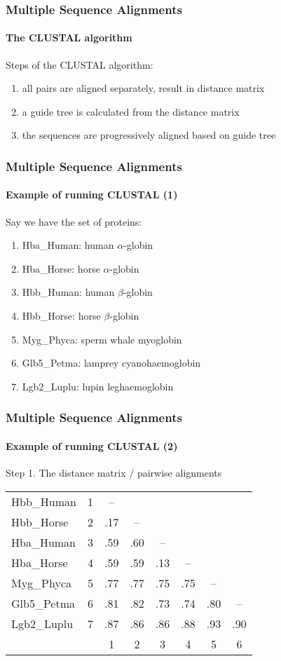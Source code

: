 \documentclass{beamer}
\begin{document}
\begin{frame}
  \frametitle{Multiple Sequence Alignments}
  \framesubtitle{The CLUSTAL algorithm}

  Steps of the CLUSTAL algorithm:
  \begin{enumerate}
    \item all pairs are aligned separately, result in distance matrix
    \item a guide tree is calculated from the distance matrix
    \item the sequences are progressively aligned based on guide tree
  \end{enumerate}
\end{frame}

\begin{frame}
  \frametitle{Multiple Sequence Alignments}
  \framesubtitle{Example of running CLUSTAL (1)}

  Say we have the set of proteins:
  \begin{enumerate}
    \item Hba\_Human: human $\alpha$-globin
    \item Hba\_Horse: horse $\alpha$-globin
    \item Hbb\_Human: human $\beta$-globin
    \item Hbb\_Horse: horse $\beta$-globin
    \item Myg\_Phyca: sperm whale myoglobin
    \item Glb5\_Petma: lamprey cyanohaemoglobin
    \item Lgb2\_Luplu: lupin leghaemoglobin
  \end{enumerate}
\end{frame}

\begin{frame}
  \frametitle{Multiple Sequence Alignments}
  \framesubtitle{Example of running CLUSTAL (2)}

  \alert{Step 1. The distance matrix / pairwise alignments}

  \begin{center}
    \begin{tabular}{lr|cccccc|}
      \cline{3-8}
      Hbb\_Human & 1 & -- &&&&& \\
      Hbb\_Horse & 2 & .17 & -- &&&& \\
      Hba\_Human & 3 & .59 & .60 & -- &&& \\
      Hba\_Horse & 4 & .59 & .59 & .13 & -- && \\
      Myg\_Phyca & 5 & .77 & .77 & .75 & .75 & -- & \\
      Glb5\_Petma & 6 & .81 & .82 & .73 & .74 & .80 & -- \\
      Lgb2\_Luplu & 7 & .87 & .86 & .86 & .88 & .93 & .90 \\
      \cline{3-8}
      &\multicolumn{1}{c}{} & 1 & 2 & 3 & 4 & 5 & \multicolumn{1}{c}{6} \\
    \end{tabular}
  \end{center}
\end{frame}
\end{document}

